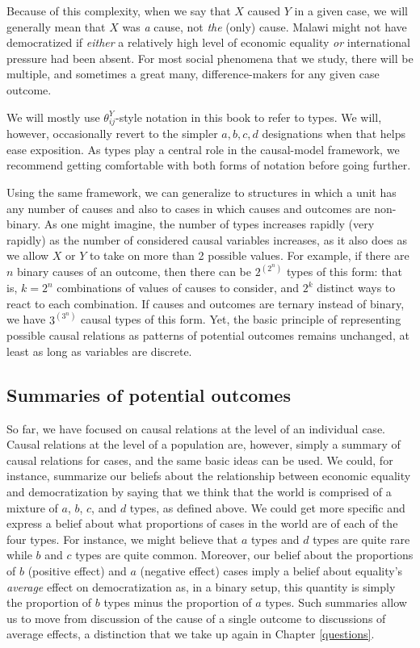 \documentclass[
  12pt,
]{book}
\begin{document}
Because of this complexity, when we say that \(X\) caused \(Y\) in a given case, we will generally mean that \(X\) was \emph{a} cause, not \emph{the} (only) cause. Malawi might not have democratized if \emph{either} a relatively high level of economic equality \emph{or} international pressure had been absent. For most social phenomena that we study, there will be multiple, and sometimes a great many, difference-makers for any given case outcome.

We will mostly use \(\theta^Y_{ij}\)-style notation in this book to refer to types. We will, however, occasionally revert to the simpler \(a, b, c, d\) designations when that helps ease exposition. As types play a central role in the causal-model framework, we recommend getting comfortable with both forms of notation before going further.

Using the same framework, we can generalize to structures in which a unit has any number of causes and also to cases in which causes and outcomes are non-binary. As one might imagine, the number of types increases rapidly (very rapidly) as the number of considered causal variables increases, as it also does as we allow \(X\) or \(Y\) to take on more than 2 possible values. For example, if there are \(n\) binary causes of an outcome, then there can be \(2^{\left(2^n\right)}\) types of this form: that is, \(k=2^n\) combinations of values of causes to consider, and \(2^k\) distinct ways to react to each combination. If causes and outcomes are ternary instead of binary, we have \(3^{\left(3^n\right)}\) causal types of this form. Yet, the basic principle of representing possible causal relations as patterns of potential outcomes remains unchanged, at least as long as variables are discrete.

\hypertarget{summaries-of-potential-outcomes}{%
\subsection{Summaries of potential outcomes}\label{summaries-of-potential-outcomes}}

So far, we have focused on causal relations at the level of an individual case. Causal relations at the level of a population are, however, simply a summary of causal relations for cases, and the same basic ideas can be used. We could, for instance, summarize our beliefs about the relationship between economic equality and democratization by saying that we think that the world is comprised of a mixture of \(a\), \(b\), \(c\), and \(d\) types, as defined above. We could get more specific and express a belief about what proportions of cases in the world are of each of the four types. For instance, we might believe that \(a\) types and \(d\) types are quite rare while \(b\) and \(c\) types are quite common. Moreover, our belief about the proportions of \(b\) (positive effect) and \(a\) (negative effect) cases imply a belief about equality's \emph{average} effect on democratization as, in a binary setup, this quantity is simply the proportion of \(b\) types minus the proportion of \(a\) types. Such summaries allow us to move from discussion of the cause of a single outcome to discussions of average effects, a distinction that we take up again in Chapter \ref{questions}.
\end{document}
